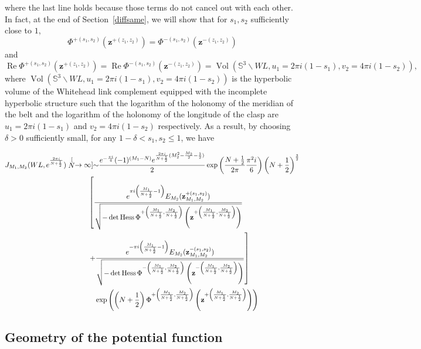 \documentclass[10pt,a4paper]{article}
\newcommand{\lt}{\left}
\newcommand{\rt}{\right}
\def\Vol{\operatorname{Vol}}
\def \Re{\operatorname{Re}}
\def\SS{{\mathbb S}}
\def\Vol{\operatorname{Vol}}
\def \Re{\operatorname{Re}}
\def \det{\operatorname{det}}
\def \Hess{\operatorname{Hess}}
\begin{document}
where the last line holds because those terms do not cancel out with each other. 
In fact, at the end of Section~\ref{diffsame}, we will show that for $s_1,s_2$ sufficiently close to $1$,
$$\Phi^{+(s_1,s_2)}(\mathbf{z}^{+(z_1,z_2)}) = 
\Phi^{-(s_1,s_2)}(\mathbf{z}^{-(z_1,z_2)}) $$
and
$$\Re\Phi^{+(s_1,s_2)}(\mathbf{z}^{+(z_1,z_2)})
= \Re\Phi^{-(s_1,s_2)}(\mathbf{z}^{-(z_1,z_2)})
= \Vol\lt(\SS^3 \backslash WL, u_1 = 2\pi i (1 - s_1), v_2=4\pi i (1 - s_2)\rt),$$
where $\Vol\lt(\SS^3 \backslash WL, u_1 = 2\pi i (1 - s_1), v_2=4\pi i (1 - s_2)\rt)  $ is the hyperbolic volume of the Whitehead link complement equipped with the incomplete hyperbolic structure such that the logarithm of the holonomy of the meridian of the belt and the logarithm of the holonomy of the longitude of the clasp are $u_1 = 2\pi i (1 - s_1)$ and $v_2=4\pi i (1 - s_2)$ respectively. As a result, by choosing $\delta>0$ sufficiently small, for any $1-\delta < s_1,s_2 \leq 1$, we have

\begin{align}
 J_{M_1, M_2} (WL, e^{\frac{2\pi i}{N+\frac{1}{2}}})
&\stackrel[N \to \infty]{\sim}{}  \frac{e^{-\frac{\pi i}{4}} (-1)^{(M_1 - N) }  e^{\frac{2\pi i}{N+\frac{1}{2}}(M_2^2 - \frac{M_2}{2} - \frac{1}{2})}}{2} \exp\lt( \frac{N+\frac{1}{2}}{2\pi } \frac{\pi^2 i}{6} \rt) \lt(N+\frac{1}{2}\rt)^\frac{3}{2}   \notag  \\
& \qquad\quad \lt[ \frac{e^{\pi i \lt(\frac{M_1}{N+\frac{1}{2}} -1\rt)}E_{M_2}(\mathbf{z}^{+(s_1,s_2)}_{M_1,M_2} )}{ \sqrt{-\det\Hess \Phi^{+\lt(\frac{M_1}{N+\frac{1}{2}}, \frac{M_2}{N+\frac{1}{2}}\rt)} \lt(\mathbf{z}^{+\lt(\frac{M_1}{N+\frac{1}{2}}, \frac{M_2}{N+\frac{1}{2}}\rt)}\rt)}}  \rt.\notag\\
& \lt.\qquad\quad +
\frac{e^{-\pi i \lt(\frac{M_1}{N+\frac{1}{2}} -1\rt)}E_{M_2}(\mathbf{z}^{-(s_1,s_2)}_{M_1,M_2} )}{ \sqrt{-\det\Hess \Phi^{-\lt(\frac{M_1}{N+\frac{1}{2}}, \frac{M_2}{N+\frac{1}{2}}\rt)} \lt(\mathbf{z}^{-\lt(\frac{M_1}{N+\frac{1}{2}}, \frac{M_2}{N+\frac{1}{2}}\rt)}\rt)}} \rt]\notag\\
&\qquad \qquad \exp\lt( \lt(N+\frac{1}{2}\rt) \Phi^{+\lt(\frac{M_1}{N+\frac{1}{2}}, \frac{M_2}{N+\frac{1}{2}}\rt)} \lt(\mathbf{z}^{+\lt(\frac{M_1}{N+\frac{1}{2}}, \frac{M_2}{N+\frac{1}{2}}\rt)} \rt) \rt)
\end{align}

\subsection{Geometry of the potential function}\label{geoWL}
\end{document}
